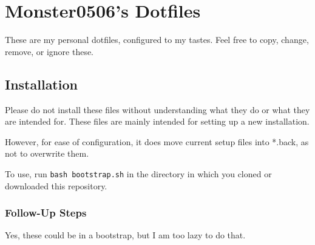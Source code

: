 \hypertarget{monster0506s-dotfiles}{%
\section{Monster0506's Dotfiles}\label{monster0506s-dotfiles}}

These are my personal dotfiles, configured to my tastes. Feel free to
copy, change, remove, or ignore these.

\hypertarget{installation}{%
\subsection{Installation}\label{installation}}

Please do not install these files without understanding what they do or
what they are intended for. These files are mainly intended for setting
up a new installation.

However, for ease of configuration, it does move current setup files
into *.back, as not to overwrite them.

To use, run \texttt{bash\ bootstrap.sh} in the directory in which you
cloned or downloaded this repository.

\hypertarget{follow-up-steps}{%
\subsubsection{Follow-Up Steps}\label{follow-up-steps}}

Yes, these could be in a bootstrap, but I am too lazy to do that.


